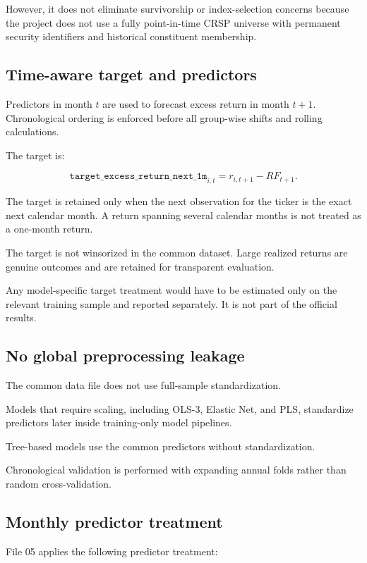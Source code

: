 \documentclass[11pt,a4paper]{article}
\newcommand{\code}[1]{\texttt{#1}}
\newcommand{\target}{\code{target\_excess\_return\_next\_1m}}
\begin{document}
However, it does not eliminate survivorship or index-selection concerns because
the project does not use a fully point-in-time CRSP universe with permanent
security identifiers and historical constituent membership.

\subsection{Time-aware target and predictors}

Predictors in month \(t\) are used to forecast excess return in month \(t+1\).
Chronological ordering is enforced before all group-wise shifts and rolling
calculations.

The target is:

\[
  \target_{i,t}
  =
  r_{i,t+1}-RF_{t+1}.
\]

The target is retained only when the next observation for the ticker is the
exact next calendar month. A return spanning several calendar months is not
treated as a one-month return.

The target is not winsorized in the common dataset. Large realized returns are
genuine outcomes and are retained for transparent evaluation.

Any model-specific target treatment would have to be estimated only on the
relevant training sample and reported separately. It is not part of the
official results.

\subsection{No global preprocessing leakage}

The common data file does not use full-sample standardization.

Models that require scaling, including OLS-3, Elastic Net, and PLS, standardize
predictors later inside training-only model pipelines.

Tree-based models use the common predictors without standardization.

Chronological validation is performed with expanding annual folds rather than
random cross-validation.

\subsection{Monthly predictor treatment}

File 05 applies the following predictor treatment:
\end{document}
